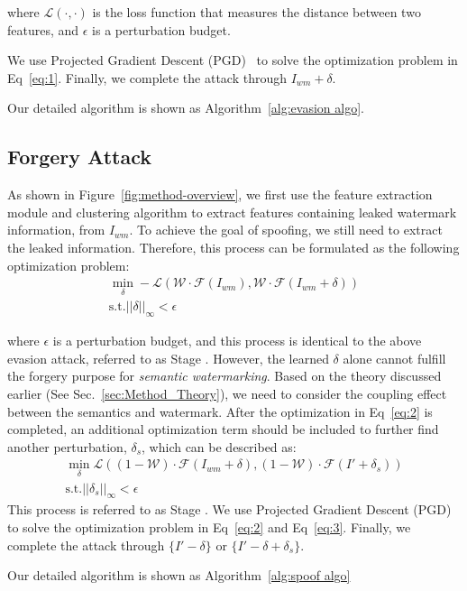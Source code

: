 where $\mathcal{L}(\cdot,\cdot)$ is the loss function that measures the distance between two features, and $\epsilon$ is a perturbation budget.

We use Projected Gradient Descent (PGD)~\cite{PGD} to solve the optimization problem in Eq~\ref{eq:1}. Finally, we complete the attack through $I_{wm} + \delta$.

Our detailed algorithm is shown as 
 Algorithm~\ref{alg:evasion algo}.


\subsection{Forgery Attack}
As shown in Figure~\ref{fig:method-overview}, we first use the feature extraction module and clustering algorithm to extract features containing leaked watermark information, from $I_{wm}$. To achieve the goal of spoofing, we still need to extract the leaked information. Therefore, this process can be formulated as the following optimization problem:
\begin{equation}
\label{eq:2}
\begin{split}
     \mathop{\min}_{\delta}-\mathcal{L}(\mathcal{W} \cdot \mathcal{F}(I_{wm}), \mathcal{W}\cdot \mathcal{F}(I_{wm} + \delta)) \\
    \mathrm{ s.t.} ||\delta||_{\infty} < \epsilon
\end{split}
\end{equation}
\vspace{-4mm}

where $\epsilon$ is a perturbation budget, and 
 this process is identical to the above evasion attack, referred to as Stage \uppercase\expandafter{}.
However, the learned $\delta$ alone cannot fulfill the forgery purpose for \emph{semantic watermarking}. Based on the theory discussed earlier (See Sec.~\ref{sec:Method_Theory}), we need to consider the coupling effect between the semantics and watermark. After the optimization in Eq~\ref{eq:2} is completed, an additional optimization term should be included to further find another perturbation, $\delta_s$, which can be described as:
\begin{equation}
\label{eq:3}
\begin{split}
     \mathop{\min}_{\delta}\mathcal{L}((1-\mathcal{W}) \cdot \mathcal{F}(I_{wm}+\delta), (1-\mathcal{W})\cdot \mathcal{F}(I' + \delta_s)) \\
    \mathrm{ s.t.} ||\delta_s||_{\infty} < \epsilon
\end{split}
\end{equation}
This process is referred to as Stage \uppercase\expandafter{}.
We use Projected Gradient Descent (PGD)~\cite{PGD} to solve the optimization problem in Eq~\ref{eq:2} and Eq~\ref{eq:3}.
Finally, we complete the attack through $\{I' - \delta\}$ or $\{I' - \delta + \delta_s \}$.

Our detailed algorithm is shown as Algorithm~\ref{alg:spoof algo}
